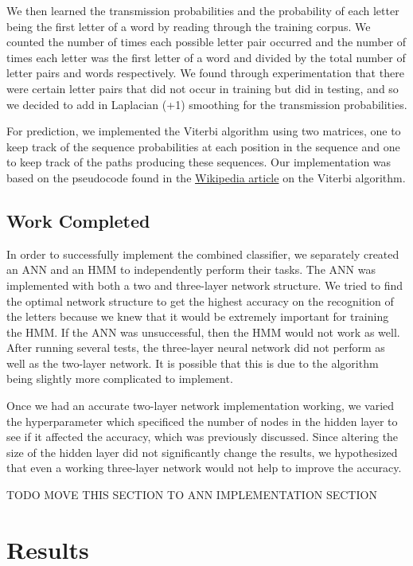 \documentclass[11pt,a4paper,twocolumn]{article}
\begin{document}
We then learned the transmission probabilities and the probability of each letter being the first
letter of a word by reading through the training corpus. We counted the number of times each
possible letter pair occurred and the number of times each letter was the first letter of a word and
divided by the total number of letter pairs and words respectively. We found through experimentation
that there were certain letter pairs that did not occur in training but did in testing, and so we
decided to add in Laplacian (+1) smoothing for the transmission probabilities.

For prediction, we implemented the Viterbi algorithm using two matrices, one to keep
track of the sequence probabilities at each position in the sequence and one to keep track
of the paths producing these sequences. Our implementation was based on the pseudocode
found in the \href{http://en.wikipedia.org/wiki/Viterbi_algorithm#Pseudocode}
{Wikipedia article} on the Viterbi algorithm.

\subsection*{Work Completed}
In order to successfully implement the combined classifier, we separately
created an ANN and an HMM to independently perform their tasks. The ANN was
implemented with both a two and three-layer network structure. We tried to
find the optimal network structure to get the highest accuracy on the
recognition of the letters because we knew that it would be extremely important
for training the HMM\@. If the ANN was unsuccessful, then the HMM would not work
as well. After running several tests, the three-layer neural network did not
perform as well as the two-layer network. It is possible that this is due to
the algorithm being slightly more complicated to implement.

Once we had an accurate two-layer network implementation working, we varied the
hyperparameter which specificed the number of nodes in the hidden layer to see
if it affected the accuracy, which was previously discussed. Since altering the
size of the hidden layer did not significantly change the results, we
hypothesized that even a working three-layer network would not help to improve
the accuracy.

TODO MOVE THIS SECTION TO ANN IMPLEMENTATION SECTION

\section{Results}
\end{document}
